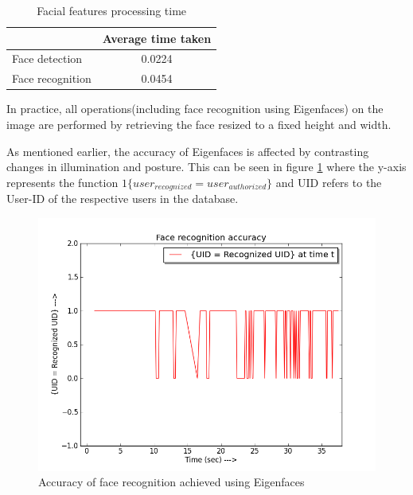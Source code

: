 \documentclass[12pt]{article}			%
\begin{document}
\begin{table}[htp]
	\centering
	\caption{Facial features processing time}
	\begin{tabular}{||l|c||} \hline \hline
			    &  Average time taken \\ \hline
	Face detection      &  0.0224             \\ \hline
	Face recognition    &  0.0454             \\ \hline \hline
	\end{tabular}
	\label{tab:fdr}
\end{table}
In practice, all operations(including face recognition using Eigenfaces) on the image are performed by retrieving the face resized to a fixed height and width.

As mentioned earlier, the accuracy of Eigenfaces is affected by contrasting changes in illumination and posture.
This can be seen in figure \ref{fig:fracc} where the y-axis represents the function $1\{user_{recognized}=user_{authorized}\}$ and UID refers to the User-ID of the respective users in the database.
\begin{figure}[h!]
	\centering
	\includegraphics[scale=0.40]{img/face_rec_accuracy.png}
	\caption{Accuracy of face recognition achieved using Eigenfaces}
	\label{fig:fracc}
\end{figure}
\end{document}
